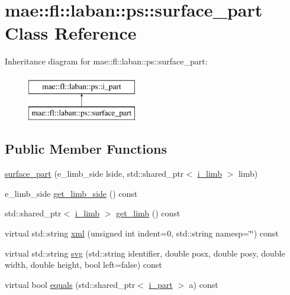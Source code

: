 \hypertarget{classmae_1_1fl_1_1laban_1_1ps_1_1surface__part}{\section{mae\-:\-:fl\-:\-:laban\-:\-:ps\-:\-:surface\-\_\-part Class Reference}
\label{classmae_1_1fl_1_1laban_1_1ps_1_1surface__part}
}
Inheritance diagram for mae\-:\-:fl\-:\-:laban\-:\-:ps\-:\-:surface\-\_\-part\-:\begin{figure}[H]
\begin{center}
\leavevmode
\includegraphics[height=2.000000cm]{classmae_1_1fl_1_1laban_1_1ps_1_1surface__part}
\end{center}
\end{figure}
\subsection*{Public Member Functions}
\begin{DoxyCompactItemize}
\item 
\hyperlink{classmae_1_1fl_1_1laban_1_1ps_1_1surface__part_a0a50c03195823029b001d0131cc78b9c}{surface\-\_\-part} (e\-\_\-limb\-\_\-side lside, std\-::shared\-\_\-ptr$<$ \hyperlink{classmae_1_1fl_1_1laban_1_1ps_1_1i__limb}{i\-\_\-limb} $>$ limb)
\item 
e\-\_\-limb\-\_\-side \hyperlink{classmae_1_1fl_1_1laban_1_1ps_1_1surface__part_a406c2c34f0a3fd4f52eb6d2aa6a1506f}{get\-\_\-limb\-\_\-side} () const 
\item 
std\-::shared\-\_\-ptr$<$ \hyperlink{classmae_1_1fl_1_1laban_1_1ps_1_1i__limb}{i\-\_\-limb} $>$ \hyperlink{classmae_1_1fl_1_1laban_1_1ps_1_1surface__part_afe1decc973947cf6ab5a142c2b3c8bc2}{get\-\_\-limb} () const 
\item 
virtual std\-::string \hyperlink{classmae_1_1fl_1_1laban_1_1ps_1_1surface__part_a1853ed550de38dbc7b1b38b6ff676904}{xml} (unsigned int indent=0, std\-::string namesp=\char`\"{}\char`\"{}) const 
\item 
virtual std\-::string \hyperlink{classmae_1_1fl_1_1laban_1_1ps_1_1surface__part_a91102bf6d87a18afa19ace304c4607e0}{svg} (std\-::string identifier, double posx, double posy, double width, double height, bool left=false) const 
\item 
virtual bool \hyperlink{classmae_1_1fl_1_1laban_1_1ps_1_1surface__part_a1ca1e44626d00dd7647927bafd86c266}{equals} (std\-::shared\-\_\-ptr$<$ \hyperlink{classmae_1_1fl_1_1laban_1_1ps_1_1i__part}{i\-\_\-part} $>$ a) const 
\end{DoxyCompactItemize}


